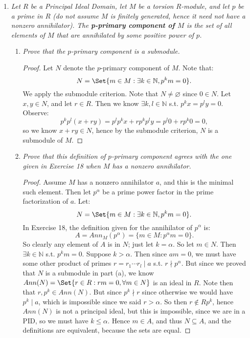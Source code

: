 \documentclass[9pt,reqno,twoside]{amsbook}
\theoremstyle{plain}
\numberwithin{section}{chapter}
\numberwithin{equation}{chapter}
\theoremstyle{definition}
\theoremstyle{remark}
\theoremstyle{plain}
\newcommand{\sub}{\subseteq}
\newcommand{\n}{\mathbb{N}}
\renewcommand{\leq}{\leqslant}
\begin{document}
\begin{enumerate}[label=\arabic*.]
  \begin{proof}
 $\forall i$, let $a_i = a/p_i^{r_i} (= \prod_{j \neq i}p_j^{r_j})$. Then $a_iM \sub M_i$, since 
 $$
 p_i^{r_i}(a_iM) = aM = 0
 $$
  (by assumptions of theorem). Then: 
 $$
 gcd(a_1,...,a_k) = 1,
 $$
 so there exists $c_1,...,c_k \in R$ s.t. $c_1a_1 + \cdots + c_ka_k = 1$. So $\forall u \in M$,
 $$
 u = c_1a_1u + \cdots + c_ka_ku \in M_1 + \cdots M_k.
 $$
 Now let $u \in M_i \cap (\sum_{j \neq i}M_j)$. Then $p_i^{r_i},a_i \in Ann(u)$. So, $(p_i^{r_i}) = (1) \sub Ann(u)$, so $u = 0$. So $\forall i,M_i \cap (\sum_{j \neq i}M_j) = 0$. 
 \end{proof}
 \setcounter{enumi}{21}
 \item \textit{Let $R$ be a Principal Ideal Domain, let $M$ be a torsion $R$-module, and let $p$ be a prime in $R$ (do not assume $M$ is finitely generated, hence it need not have a nonzero annihilator). The \textbf{p-primary component of $M$} is the set of all elements of $M$ that are annihilated by some positive power of $p$. }
 \begin{enumerate}
 \item \textit{Prove that the $p$-primary component is a submodule. }
 \begin{proof}
 Let $N$ denote the $p$-primary component of $M$. Note that: 
 $$
 N = \Set{m \in M: \exists k\in \n,p^km = 0}. 
 $$
We apply the submodule criterion. Note that $N \neq \varnothing$ since $0 \in N$. Let $x,y \in N$, and let $r \in R$. Then we know $\exists k,l \in \n$ s.t. $p^kx = p^ly = 0$. Observe: 
$$
p^kp^l(x + ry) = p^lp^kx + rp^kp^ly = p^l0 + rp^k0 = 0,
$$
so we know $x + ry \in N$, hence by the submodule criterion, $N$ is a submodule of $M$. 
 \end{proof}
 
 \item \textit{Prove that this definition of $p$-primary component agrees with the one given in Exercise 18 when $M$ has a nonzero annihilator. }
 \begin{proof}
 Assume $M$ has a nonzero annihilator $a$, and this is the minimal such element. Then let $p^\alpha$ be a prime power factor in the prime factorization of $a$. Let:
 $$
 N = \Set{m \in M: \exists k\in \n,p^km = 0}.
 $$
 In Exercise 18, the definition given for the annihilator of $p^\alpha$ is: 
 $$
 A = Ann_M(p^\alpha) = \{m \in M: p^\alpha m = 0\}.
 $$
 So clearly any element of $A$ is in $N$; just let $k =\alpha$. So let $m \in N$. Then $\exists k \in \n$ s.t. $p^km = 0$. Suppose $k > \alpha$. Then since $am = 0$, we must have some other product of primes $r = r_1\cdots r_l\mid a$ s.t. $r \nmid p^{\alpha}$. But since we proved that $N$ is a submodule in part (a), we know $Ann(N) = \Set{r \in R: rm = 0,\forall m \in N}$ is an ideal in $R$. Note then that $r,p^k \in Ann(N)$. But since $p^k \nmid r$ since otherwise we would have $p^k \mid a$, which is impossible since we said $r > \alpha$. So then $r \notin Rp^k$, hence $Ann(N)$ is not a principal ideal, but this is impossible, since we are in a PID, so we must have $k \leq \alpha$. Hence $m \in A$, and thus $N \sub A$, and the definitions are equivalent, because the sets are equal. 
 

\end{proof}
\end{enumerate}
\end{enumerate}
\end{document}
